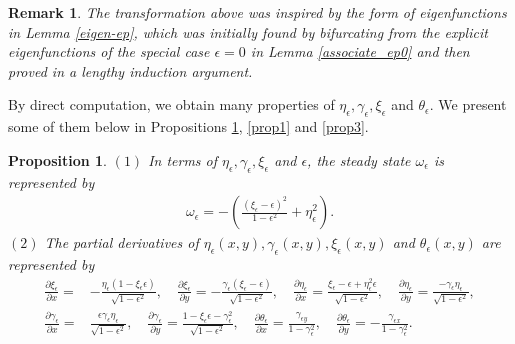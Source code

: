 \documentclass[1 [leqno, 11pt]{amsart}
\numberwithin{equation}{section}
\let\ep=\epsilon
\newtheorem{proposition}[Theorem]{Proposition}
\newtheorem{remark}[Theorem]{Remark}
\begin{document}
\begin{CJK*}{GBK}{song}
\begin{remark}
The transformation above was inspired by the form of eigenfunctions in Lemma \ref{eigen-ep}, which was initially found by bifurcating from the explicit eigenfunctions of the special case $\ep = 0$ in Lemma \ref{associate_ep0} and then proved in a lengthy induction argument.
\end{remark}
\fi
By direct computation, we  obtain many  properties of $\eta_\ep, \gamma_\ep, \xi_\ep$ and $\theta_\ep$. We present some of them below in Propositions \ref{prop0}, \ref{prop1} and \ref{prop3}.
\begin{proposition}\label{prop0}
$(1)$ In terms of $\eta_\ep, \gamma_\ep, \xi_\ep$ and $\ep$, the steady state $ \omega_\ep$ is represented by
\begin{align}\label{omega-xi-eta-gamma-ep}\omega_\ep = -\left(\frac{(\xi_\ep - \ep)^2}{1-\ep^2} + \eta_\ep^2\right).\end{align}
$(2)$ The partial derivatives of $\eta_\ep(x, y), \gamma_\ep(x, y), \xi_\ep(x, y)$ and $\theta_\ep(x, y)$ are represented by
\begin{align*}\frac{\partial \xi_\ep}{\partial x} =& -\frac{\eta_\ep (1-\xi_\ep \ep)}{\sqrt{1-\ep^2}}, \quad \frac{\partial \xi_\ep}{\partial y} = -\frac{\gamma_\ep (\xi_\ep - \ep)}{\sqrt{1-\ep^2}},\quad
\frac{\partial \eta_\ep}{\partial x} = \frac{\xi_\ep - \ep + \eta_\ep^2 \ep}{\sqrt{1-\ep^2}}, \quad \frac{\partial \eta_\ep}{\partial y} = \frac{-\gamma_\ep \eta_\ep}{\sqrt{1-\ep^2}},\\
\frac{\partial \gamma_\ep}{\partial x} =& \frac{\ep \gamma_\ep \eta_\ep}{\sqrt{1-\ep^2}}, \quad \frac{\partial \gamma_\ep}{\partial y} = \frac{1-\xi_\ep \ep - \gamma_\ep^2}{\sqrt{1-\ep^2}},\quad
\frac{\partial \theta_\ep}{\partial x} = \frac{\gamma_{\ep y}}{1-\gamma_\ep^2}, \quad \frac{\partial \theta_\ep}{\partial y} = - \frac{\gamma_{\ep x}}{1-\gamma_\ep^2}.\end{align*}
\end{proposition}


\end{CJK*}
\end{document}
